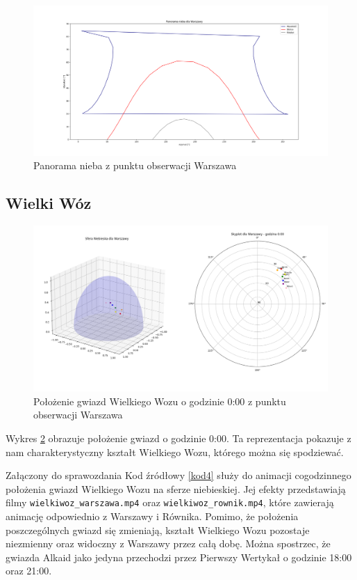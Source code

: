\documentclass[fleqn,10pt,a4paper]{article}
\begin{document}
\clearpage
\begin{figure}[h!]
  \centering
  \includegraphics[width=1\textwidth]{zdjecia/panorama_wwa_b.png}
  \caption{Panorama nieba z punktu obserwacji Warszawa}
  \label{pan_wwa}
\end{figure}

\subsection{Wielki Wóz}

\begin{figure}[h!]
  \centering
  \includegraphics[width=1\textwidth]{zdjecia/wielkiwoz1_wwa.png}
  \caption{Położenie gwiazd Wielkiego Wozu o godzinie 0:00 z punktu obserwacji Warszawa}
  \label{wielkiwoz_wwa_0}
\end{figure}

Wykres \ref{wielkiwoz_wwa_0} obrazuje położenie gwiazd o godzinie 0:00.
Ta reprezentacja pokazuje z nam charakterystyczny kształt Wielkiego Wozu, którego można się spodziewać.

Załączony do sprawozdania Kod źródłowy \ref{kod4} służy do animacji cogodzinnego położenia 
gwiazd Wielkiego Wozu na sferze niebieskiej. 
Jej efekty przedstawiają filmy \texttt{wielkiwoz\_warszawa.mp4} oraz \texttt{wielkiwoz\_rownik.mp4}, które zawierają animację odpowiednio
z Warszawy i Równika. 
Pomimo, że położenia poszczególnych gwiazd się zmieniają, kształt Wielkiego Wozu pozostaje niezmienny oraz widoczny z Warszawy przez całą dobę. 
Można spostrzec, że gwiazda Alkaid jako jedyna przechodzi przez Pierwszy Wertykał o godzinie 18:00 oraz 21:00.
\end{document}
